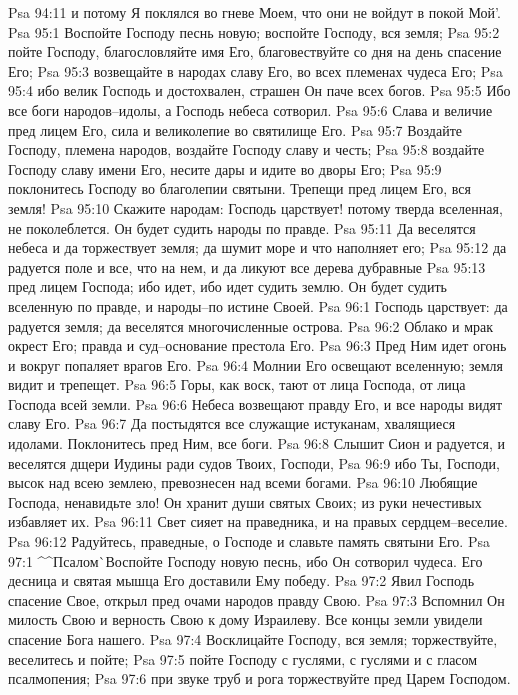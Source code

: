 Psa 94:11  и потому Я поклялся во гневе Моем, что они не войдут в покой Мой'.
Psa 95:1  Воспойте Господу песнь новую; воспойте Господу, вся земля;
Psa 95:2  пойте Господу, благословляйте имя Его, благовествуйте со дня на день спасение Его;
Psa 95:3  возвещайте в народах славу Его, во всех племенах чудеса Его;
Psa 95:4  ибо велик Господь и достохвален, страшен Он паче всех богов.
Psa 95:5  Ибо все боги народов--идолы, а Господь небеса сотворил.
Psa 95:6  Слава и величие пред лицем Его, сила и великолепие во святилище Его.
Psa 95:7  Воздайте Господу, племена народов, воздайте Господу славу и честь;
Psa 95:8  воздайте Господу славу имени Его, несите дары и идите во дворы Его;
Psa 95:9  поклонитесь Господу во благолепии святыни. Трепещи пред лицем Его, вся земля!
Psa 95:10  Скажите народам: Господь царствует! потому тверда вселенная, не поколеблется. Он будет судить народы по правде.
Psa 95:11  Да веселятся небеса и да торжествует земля; да шумит море и что наполняет его;
Psa 95:12  да радуется поле и все, что на нем, и да ликуют все дерева дубравные
Psa 95:13  пред лицем Господа; ибо идет, ибо идет судить землю. Он будет судить вселенную по правде, и народы--по истине Своей.
Psa 96:1  Господь царствует: да радуется земля; да веселятся многочисленные острова.
Psa 96:2  Облако и мрак окрест Его; правда и суд--основание престола Его.
Psa 96:3  Пред Ним идет огонь и вокруг попаляет врагов Его.
Psa 96:4  Молнии Его освещают вселенную; земля видит и трепещет.
Psa 96:5  Горы, как воск, тают от лица Господа, от лица Господа всей земли.
Psa 96:6  Небеса возвещают правду Его, и все народы видят славу Его.
Psa 96:7  Да постыдятся все служащие истуканам, хвалящиеся идолами. Поклонитесь пред Ним, все боги.
Psa 96:8  Слышит Сион и радуется, и веселятся дщери Иудины ради судов Твоих, Господи,
Psa 96:9  ибо Ты, Господи, высок над всею землею, превознесен над всеми богами.
Psa 96:10  Любящие Господа, ненавидьте зло! Он хранит души святых Своих; из руки нечестивых избавляет их.
Psa 96:11  Свет сияет на праведника, и на правых сердцем--веселие.
Psa 96:12  Радуйтесь, праведные, о Господе и славьте память святыни Его.
Psa 97:1  ^^Псалом^^ Воспойте Господу новую песнь, ибо Он сотворил чудеса. Его десница и святая мышца Его доставили Ему победу.
Psa 97:2  Явил Господь спасение Свое, открыл пред очами народов правду Свою.
Psa 97:3  Вспомнил Он милость Свою и верность Свою к дому Израилеву. Все концы земли увидели спасение Бога нашего.
Psa 97:4  Восклицайте Господу, вся земля; торжествуйте, веселитесь и пойте;
Psa 97:5  пойте Господу с гуслями, с гуслями и с гласом псалмопения;
Psa 97:6  при звуке труб и рога торжествуйте пред Царем Господом.

